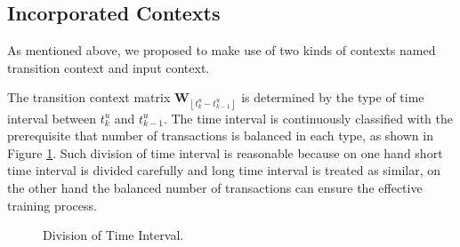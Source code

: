 \documentclass[conference]{IEEEtran}
\begin{document}
\subsection{Incorporated Contexts }
As mentioned above, we proposed to make use of two kinds of contexts named transition context and input context.

The transition context matrix $\textbf{W}_{\left\lfloor t_k^u-t_{k-1}^u \right\rfloor }$ is determined by the type of time interval between $t_k^u$ and $t_{k-1}^u$. The time interval is continuously classified with the prerequisite that number of transactions is balanced in each type, as shown in Figure \ref{fig:comparision}. Such division of time interval is reasonable because on one hand short time interval is divided carefully and long time interval is treated as similar, on the other hand the balanced number of transactions can ensure the effective training process.
\begin{figure}[!tb]
\centering
{}
\hspace{-1mm}
\caption{Division of Time Interval.}
\label{fig:comparision}
\end{figure}
\end{document}
